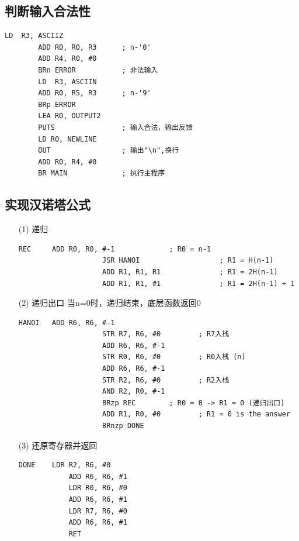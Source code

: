 \documentclass[UTF8]{ctexart}
\begin{document}
    \subsection{判断输入合法性}
    \begin{lstlisting}[basicstyle=\ttfamily,language={[x86masm]Assembler}]
        LD  R3, ASCIIZ
        ADD R0, R0, R3      ; n-'0'
        ADD R4, R0, #0      
        BRn ERROR           ; 非法输入
        LD  R3, ASCIIN     
        ADD R0, R5, R3      ; n-'9'
        BRp ERROR
        LEA R0, OUTPUT2 
        PUTS                ; 输入合法，输出反馈
        LD R0, NEWLINE
        OUT                 ; 输出"\n",换行
        ADD R0, R4, #0
        BR MAIN             ; 执行主程序
    \end{lstlisting}

    \subsection{实现汉诺塔公式}
    \begin{enumerate}
        \item [(1)]递归
        \begin{lstlisting}[basicstyle=\ttfamily,language={[x86masm]Assembler}]
            REC     ADD R0, R0, #-1             ; R0 = n-1
                    JSR HANOI                   ; R1 = H(n-1)
                    ADD R1, R1, R1              ; R1 = 2H(n-1)
                    ADD R1, R1, #1              ; R1 = 2H(n-1) + 1
        \end{lstlisting}
        \item [(2)]递归出口
        当n=0时，递归结束，底层函数返回0
        \begin{lstlisting}[basicstyle=\ttfamily,language={[x86masm]Assembler}]
            HANOI   ADD R6, R6, #-1
                    STR R7, R6, #0         ; R7入栈
                    ADD R6, R6, #-1
                    STR R0, R6, #0         ; R0入栈 (n)
                    ADD R6, R6, #-1
                    STR R2, R6, #0         ; R2入栈
                    AND R2, R0, #-1
                    BRzp REC        ; R0 = 0 -> R1 = 0 (递归出口)    
                    ADD R1, R0, #0         ; R1 = 0 is the answer
                    BRnzp DONE
        \end{lstlisting}
        \item [(3)]还原寄存器并返回
        \begin{lstlisting}[basicstyle=\ttfamily,language={[x86masm]Assembler}]
            DONE    LDR R2, R6, #0
            ADD R6, R6, #1
            LDR R0, R6, #0
            ADD R6, R6, #1
            LDR R7, R6, #0
            ADD R6, R6, #1
            RET
        \end{lstlisting}
    \end{enumerate}
\end{document}
